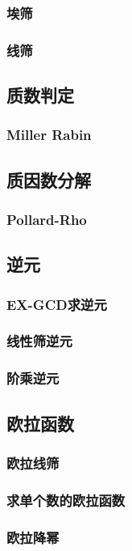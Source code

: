 \documentclass[twocolumn,a4]{article}
\newcommand{\addcpp}[1]{}
\begin{document}
		\subsubsection{埃筛}
		\subsubsection{线筛}
	\subsection{质数判定}
		\subsubsection{Miller Rabin}
	\subsection{质因数分解}
		\subsubsection{Pollard-Rho}
	\subsection{逆元}
		\subsubsection{EX-GCD求逆元}
		\subsubsection{线性筛逆元}
		\subsubsection{阶乘逆元}
	\subsection{欧拉函数}
		\subsubsection{欧拉线筛}
		\subsubsection{求单个数的欧拉函数}
		\subsubsection{欧拉降幂}
\end{document}
